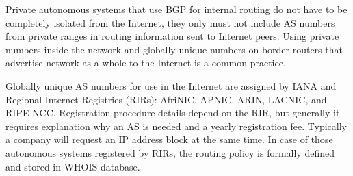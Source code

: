 Private autonomous systems that use BGP for internal routing do not have to be completely isolated from the Internet,
they only must not include AS numbers from private ranges in routing information sent to Internet peers. Using private
numbers inside the network and globally unique numbers on border routers that advertise network as a whole to the Internet
is a common practice.

Globally unique AS numbers for use in the Internet are assigned by IANA and Regional Internet Registries (RIRs): AfriNIC, APNIC,
ARIN, LACNIC, and RIPE NCC. Registration procedure details depend on the RIR, but generally it requires explanation why
an AS is needed and a yearly registration fee. Typically a company will request an IP address block at the same time.
In case of those autonomous systems registered by RIRs, the routing policy is formally defined and stored in WHOIS database.

